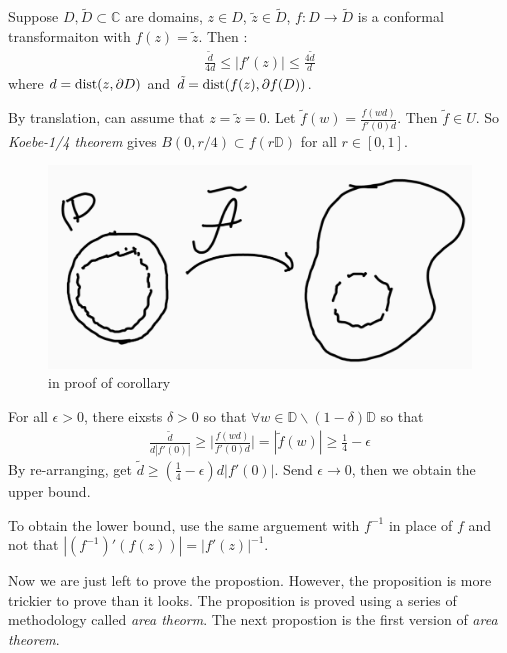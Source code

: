 \documentclass[12pt,a4paper]{article}
\newenvironment{proof}
{\begin{changemargin}{0.5cm}{0.5cm} 
	}%
	{\end{changemargin}
}
\begin{document}
\corr Suppose $D, \tilde{D} \subset \mathbb{C}$ are domains, $z\in D$, $\tilde{z} \in \tilde{D}$, $f: D\rightarrow \tilde{D}$ is a conformal transformaiton with $f(z) = \tilde{z}$. Then :
\begin{align*}
\frac{\tilde{d}}{4d} \leq |f'(z)| \leq \frac{4\tilde{d}}{d}
\end{align*}
where $d= \text{dist}(z, \partial D)$ and $\tilde{d} = \text{dist}(f(z), \partial f(D))$.
\begin{proof}
\pf By translation, can assume that $z=\tilde{z} =0$. Let $\tilde{f}(w) = \frac{f(wd)}{f'(0)d}$. Then $\tilde{f}\in U$. So \emph{Koebe-1/4 theorem} gives $B(0, r/4) \subset f(r\mathbb{D})$ for all $r\in [0,1]$.

\begin{figure}[h]
\begin{center}
    \includegraphics[scale =0.15]{4}
    \caption{in proof of corollary}
\end{center}
\end{figure}

For all $\epsilon>0$, there eixsts $\delta >0$ so that $\forall w\in \mathbb{D} \backslash (1-\delta) \mathbb{D}$ so that
\begin{align*}
\frac{\tilde{d}}{d|f'(0)|} \geq \Big| \frac{f(wd)}{f'(0)d}\Big| = |\tilde{f}(w)| \geq \frac{1}{4} - \epsilon
\end{align*}
By re-arranging, get $\tilde{d} \geq (\frac{1}{4} - \epsilon)d|f'(0)|$. Send $\epsilon \rightarrow 0$, then we obtain the upper bound.
\s

\quad To obtain the lower bound, use the same arguement with $f^{-1}$ in place of $f$ and not that $|(f^{-1})'(f(z))| = |f'(z)|^{-1}$.

\eop
\end{proof}
\s

Now we are just left to prove the propostion. However, the proposition is more trickier to prove than it looks. The proposition is proved using a series of methodology called \emph{area theorm}. The next propostion is the first version of \emph{area theorem}.
\s
\end{document}
